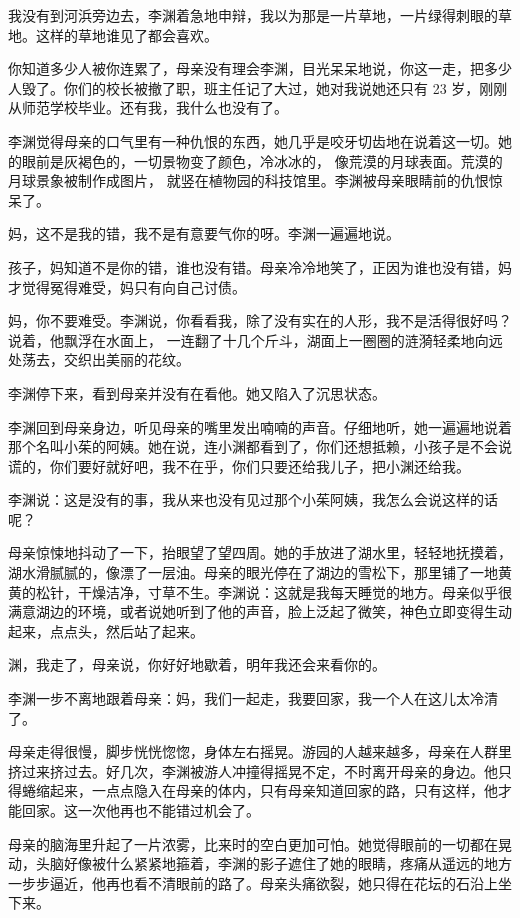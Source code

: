 \documentclass[UTF8]{ctexart}
\begin{document}
我没有到河浜旁边去，李渊着急地申辩，我以为那是一片草地，一片绿得刺眼的草地。这样的草地谁见了都会喜欢。

你知道多少人被你连累了，母亲没有理会李渊，目光呆呆地说，你这一走，把多少人毁了。你们的校长被撤了职，班主任记了大过，她对我说她还只有
23 岁，刚刚从师范学校毕业。还有我，我什么也没有了。

李渊觉得母亲的口气里有一种仇恨的东西，她几乎是咬牙切齿地在说着这一切。她的眼前是灰褐色的，一切景物变了颜色，冷冰冰的，
像荒漠的月球表面。荒漠的月球景象被制作成图片，
就竖在植物园的科技馆里。李渊被母亲眼睛前的仇恨惊呆了。

妈，这不是我的错，我不是有意要气你的呀。李渊一遍遍地说。

孩子，妈知道不是你的错，谁也没有错。母亲冷冷地笑了，正因为谁也没有错，妈才觉得冤得难受，妈只有向自己讨债。

妈，你不要难受。李渊说，你看看我，除了没有实在的人形，我不是活得很好吗？说着，他飘浮在水面上，
一连翻了十几个斤斗，湖面上一圈圈的涟漪轻柔地向远处荡去，交织出美丽的花纹。

李渊停下来，看到母亲并没有在看他。她又陷入了沉思状态。

李渊回到母亲身边，听见母亲的嘴里发出喃喃的声音。仔细地听，她一遍遍地说着那个名叫小茱的阿姨。她在说，连小渊都看到了，你们还想抵赖，小孩子是不会说谎的，你们要好就好吧，我不在乎，你们只要还给我儿子，把小渊还给我。

李渊说：这是没有的事，我从来也没有见过那个小茱阿姨，我怎么会说这样的话呢？

母亲惊悚地抖动了一下，抬眼望了望四周。她的手放进了湖水里，轻轻地抚摸着，湖水滑腻腻的，像漂了一层油。母亲的眼光停在了湖边的雪松下，那里铺了一地黄黄的松针，干燥洁净，寸草不生。李渊说：这就是我每天睡觉的地方。母亲似乎很满意湖边的环境，或者说她听到了他的声音，脸上泛起了微笑，神色立即变得生动起来，点点头，然后站了起来。

渊，我走了，母亲说，你好好地歇着，明年我还会来看你的。

李渊一步不离地跟着母亲：妈，我们一起走，我要回家，我一个人在这儿太冷清了。

母亲走得很慢，脚步恍恍惚惚，身体左右摇晃。游园的人越来越多，母亲在人群里挤过来挤过去。好几次，李渊被游人冲撞得摇晃不定，不时离开母亲的身边。他只得蜷缩起来，一点点隐入在母亲的体内，只有母亲知道回家的路，只有这样，他才能回家。这一次他再也不能错过机会了。

母亲的脑海里升起了一片浓雾，比来时的空白更加可怕。她觉得眼前的一切都在晃动，头脑好像被什么紧紧地箍着，李渊的影子遮住了她的眼睛，疼痛从遥远的地方一步步逼近，他再也看不清眼前的路了。母亲头痛欲裂，她只得在花坛的石沿上坐下来。
\end{document}
